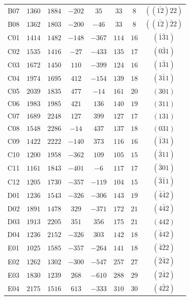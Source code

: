 \begin{table}[H]
\begin{tabular}{c|c|c|c|c|c|c|c}
        B07 & $1360$ & $1884$ & $-202$ & $  35$ & $ 33$ & $ 8$ & $((\bar{12})22)$ \\
        B08 & $1362$ & $1803$ & $-200$ & $ -46$ & $ 33$ & $ 8$ & $((\bar{12})\bar{2}2)$ \\
        C01 & $1414$ & $1482$ & $-148$ & $-367$ & $114$ & $16$ & $(\bar{1}\bar{3}1)$ \\
        C02 & $1535$ & $1416$ & $ -27$ & $-433$ & $135$ & $17$ & $(0\bar{3}1)$ \\
        C03 & $1672$ & $1450$ & $ 110$ & $-399$ & $124$ & $16$ & $(1\bar{3}1)$ \\
        C04 & $1974$ & $1695$ & $ 412$ & $-154$ & $139$ & $18$ & $(3\bar{1}1)$ \\
        C05 & $2039$ & $1835$ & $ 477$ & $ -14$ & $161$ & $20$ & $(301)$ \\
        C06 & $1983$ & $1985$ & $ 421$ & $ 136$ & $140$ & $19$ & $(311)$ \\
        C07 & $1689$ & $2248$ & $ 127$ & $ 399$ & $127$ & $17$ & $(131)$ \\
        C08 & $1548$ & $2286$ & $ -14$ & $ 437$ & $137$ & $18$ & $(031)$ \\
        C09 & $1422$ & $2222$ & $-140$ & $ 373$ & $116$ & $16$ & $(\bar{1}31)$ \\
        C10 & $1200$ & $1958$ & $-362$ & $ 109$ & $105$ & $15$ & $(\bar{3}11)$ \\
        C11 & $1161$ & $1843$ & $-401$ & $  -6$ & $117$ & $17$ & $(\bar{3}01)$ \\
        C12 & $1205$ & $1730$ & $-357$ & $-119$ & $104$ & $15$ & $(\bar{3}\bar{1}1)$ \\
        D01 & $1236$ & $1543$ & $-326$ & $-306$ & $143$ & $19$ & $(\bar{4}\bar{4}2)$ \\
        D02 & $1891$ & $1478$ & $ 329$ & $-371$ & $172$ & $21$ & $(4\bar{4}2)$ \\
        D03 & $1913$ & $2205$ & $ 351$ & $ 356$ & $175$ & $21$ & $(442)$ \\
        D04 & $1236$ & $2152$ & $-326$ & $ 303$ & $142$ & $18$ & $(\bar{4}42)$ \\
        E01 & $1025$ & $1585$ & $-357$ & $-264$ & $141$ & $18$ & $(\bar{4}\bar{2}2)$ \\
        E02 & $1262$ & $1302$ & $-300$ & $-547$ & $257$ & $27$ & $(\bar{2}\bar{4}2)$ \\
        E03 & $1830$ & $1239$ & $ 268$ & $-610$ & $288$ & $29$ & $(2\bar{4}2)$ \\
        E04 & $2175$ & $1516$ & $ 613$ & $-333$ & $310$ & $30$ & $(4\bar{2}2)$ \\

\end{tabular}
\end{table}
